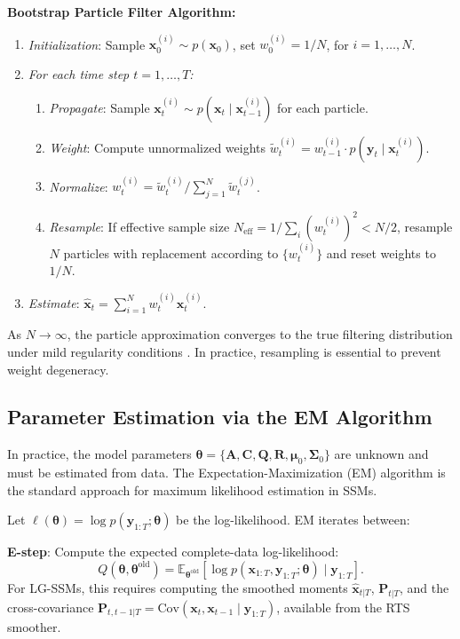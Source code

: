 \documentclass[conference]{IEEEtran}
\begin{document}
\textbf{Bootstrap Particle Filter Algorithm:}
\begin{enumerate}
\item \textit{Initialization}: Sample $\mathbf{x}_0^{(i)} \sim p(\mathbf{x}_0)$, set $w_0^{(i)} = 1/N$, for $i = 1, \ldots, N$.
\item \textit{For each time step $t = 1, \ldots, T$:}
  \begin{enumerate}
    \item \textit{Propagate}: Sample $\mathbf{x}_t^{(i)} \sim p(\mathbf{x}_t \mid \mathbf{x}_{t-1}^{(i)})$ for each particle.
    \item \textit{Weight}: Compute unnormalized weights $\tilde{w}_t^{(i)} = w_{t-1}^{(i)} \cdot p(\mathbf{y}_t \mid \mathbf{x}_t^{(i)})$.
    \item \textit{Normalize}: $w_t^{(i)} = \tilde{w}_t^{(i)} / \sum_{j=1}^N \tilde{w}_t^{(j)}$.
    \item \textit{Resample}: If effective sample size $N_\text{eff} = 1/\sum_i (w_t^{(i)})^2 < N/2$, resample $N$ particles with replacement according to $\{w_t^{(i)}\}$ and reset weights to $1/N$.
  \end{enumerate}
\item \textit{Estimate}: $\hat{\mathbf{x}}_t = \sum_{i=1}^N w_t^{(i)} \mathbf{x}_t^{(i)}$.
\end{enumerate}

As $N \to \infty$, the particle approximation converges to the true filtering distribution under mild regularity conditions \cite{crisan2002survey}. In practice, resampling is essential to prevent weight degeneracy.

\subsection{Parameter Estimation via the EM Algorithm}

In practice, the model parameters $\boldsymbol{\theta} = \{\mathbf{A}, \mathbf{C}, \mathbf{Q}, \mathbf{R}, \boldsymbol{\mu}_0, \boldsymbol{\Sigma}_0\}$ are unknown and must be estimated from data. The Expectation-Maximization (EM) algorithm \cite{dempster1977maximum,shumway1982approach} is the standard approach for maximum likelihood estimation in SSMs.

Let $\ell(\boldsymbol{\theta}) = \log p(\mathbf{y}_{1:T}; \boldsymbol{\theta})$ be the log-likelihood. EM iterates between:

\textbf{E-step}: Compute the expected complete-data log-likelihood:
\begin{equation}
Q(\boldsymbol{\theta}, \boldsymbol{\theta}^\text{old}) = \mathbb{E}_{\boldsymbol{\theta}^\text{old}}\left[\log p(\mathbf{x}_{1:T}, \mathbf{y}_{1:T}; \boldsymbol{\theta}) \mid \mathbf{y}_{1:T}\right].
\end{equation}
For LG-SSMs, this requires computing the smoothed moments $\hat{\mathbf{x}}_{t|T}$, $\mathbf{P}_{t|T}$, and the cross-covariance $\mathbf{P}_{t,t-1|T} = \mathrm{Cov}(\mathbf{x}_t, \mathbf{x}_{t-1} \mid \mathbf{y}_{1:T})$, available from the RTS smoother.
\end{document}
